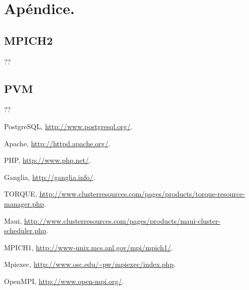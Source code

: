 \documentclass[a4paper,10pt,spanish]{article}
\begin{document}
\section{Ap\'{e}ndice.}

\subsection{MPICH2}
??

\subsection{PVM}
??

\begin{thebibliography}{99}
PostgreSQL, \url{http://www.postgresql.org/}.

Apache, \url{http://httpd.apache.org/}.

PHP, \url{http://www.php.net/}.

Ganglia, \url{http://ganglia.info/}.

TORQUE, \url{http://www.clusterresources.com/pages/products/torque-resource-manager.php}.

Maui, \url{http://www.clusterresources.com/pages/products/maui-cluster-scheduler.php}.

MPICH1, \url{http://www-unix.mcs.anl.gov/mpi/mpich1/}.

Mpiexec, \url{http://www.osc.edu/~pw/mpiexec/index.php}.

OpenMPI, \url{http://www.open-mpi.org/}.

\end{thebibliography}
\end{document}
